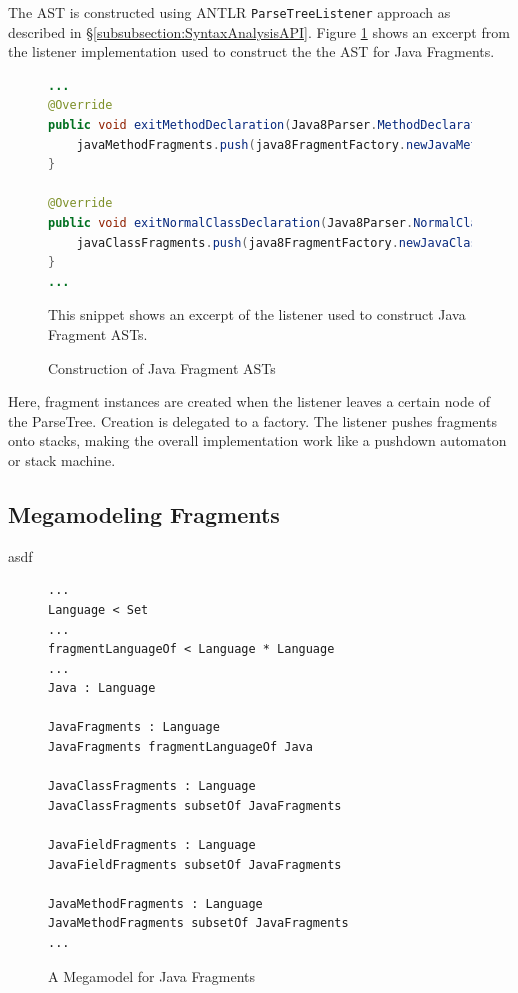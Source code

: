 The \gls{AST} is constructed using \gls{ANTLR} \texttt{ParseTreeListener} approach as described in §\ref{subsubsection:SyntaxAnalysisAPI}.
Figure \ref{figure:JavaFragmentASTConstruction} shows an excerpt from the listener implementation used to construct the the \gls{AST} for \gls{Java} \glspl{Fragment}.
\begin{figure}[h!]
\begin{lstlisting}[language=Java]
...
@Override
public void exitMethodDeclaration(Java8Parser.MethodDeclarationContext ctx) {
    javaMethodFragments.push(java8FragmentFactory.newJavaMethodFragment(ctx, javaMethodModifierFragments));
}

@Override
public void exitNormalClassDeclaration(Java8Parser.NormalClassDeclarationContext ctx) {
    javaClassFragments.push(java8FragmentFactory.newJavaClassFragment(ctx, javaClassModifierFragments, javaFieldFragments, javaMethodFragments, declaredPackage));
}
...
\end{lstlisting}
{
\scriptsize
This snippet shows an excerpt of the listener used to construct \gls{Java} \gls{Fragment} \glspl{AST}.
}
\caption{Construction of Java Fragment ASTs}
\label{figure:JavaFragmentASTConstruction}
\end{figure}
Here, fragment instances are created when the listener leaves a certain node of the \gls{ParseTree}.
Creation is delegated to a factory.
The listener pushes fragments onto stacks, making the overall implementation work like a pushdown automaton or stack machine.



\subsection{Megamodeling Fragments}
\label{subsection:MegamodelingFragments}
asdf
\begin{figure}[h!]
\begin{lstlisting}
...
Language < Set
...
fragmentLanguageOf < Language * Language
...
Java : Language

JavaFragments : Language
JavaFragments fragmentLanguageOf Java

JavaClassFragments : Language
JavaClassFragments subsetOf JavaFragments

JavaFieldFragments : Language
JavaFieldFragments subsetOf JavaFragments

JavaMethodFragments : Language
JavaMethodFragments subsetOf JavaFragments
...
\end{lstlisting}
{
\scriptsize
}
\caption{A \Gls{Megamodel} for \Gls{Java} \Glspl{Fragment}}
\label{figure:JavaFragmentMegamodel}
\end{figure}


